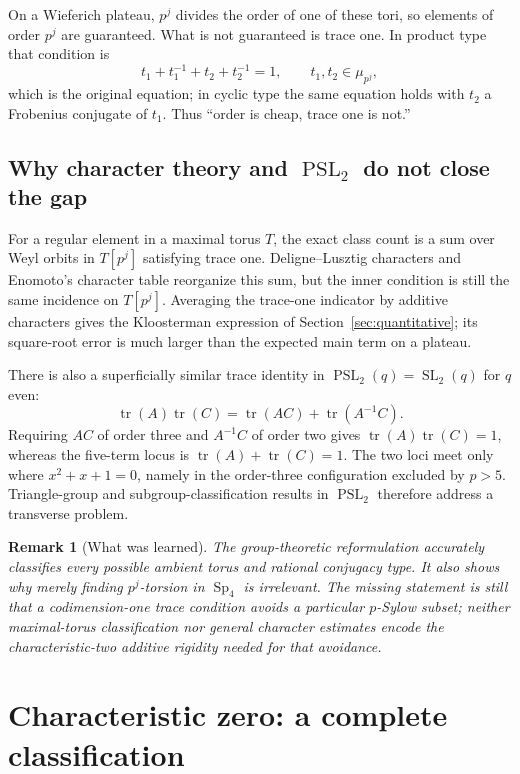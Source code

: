 \documentclass[a4paper]{article}
\newtheorem{remark}[theorem]{Remark}
\newcommand{\Sp}{\operatorname{Sp}}
\newcommand{\SL}{\operatorname{SL}}
\newcommand{\PSL}{\operatorname{PSL}}
\begin{document}
On a Wieferich plateau, $p^j$ divides the order of one of these tori, so
elements of order $p^j$ are guaranteed.  What is not guaranteed is trace
one.  In product type that condition is
\[
	t_1+t_1^{-1}+t_2+t_2^{-1}=1,
	\qquad t_1,t_2\in\mu_{p^j},
\]
which is the original equation; in cyclic type the same equation holds
with $t_2$ a Frobenius conjugate of $t_1$.  Thus ``order is cheap, trace one
is not.''

\subsection{Why character theory and $\PSL_2$ do not close the gap}

For a regular element in a maximal torus $T$, the exact class count is a
sum over Weyl orbits in $T[p^j]$ satisfying trace one.  Deligne--Lusztig
characters and Enomoto's character table reorganize this sum, but the inner
condition is still the same incidence on $T[p^j]$.  Averaging the trace-one
indicator by additive characters gives the Kloosterman expression of
Section~\ref{sec:quantitative}; its square-root error is much larger than
the expected main term on a plateau.

There is also a superficially similar trace identity in
$\PSL_2(q)=\SL_2(q)$ for $q$ even:
\[
	\operatorname{tr}(A)\operatorname{tr}(C)
	=\operatorname{tr}(AC)+\operatorname{tr}(A^{-1}C).
\]
Requiring $AC$ of order three and $A^{-1}C$ of order two gives
$\operatorname{tr}(A)\operatorname{tr}(C)=1$, whereas the five-term locus
is $\operatorname{tr}(A)+\operatorname{tr}(C)=1$.  The two loci meet only
where $x^2+x+1=0$, namely in the order-three configuration excluded by
$p>5$.  Triangle-group and subgroup-classification results in $\PSL_2$
therefore address a transverse problem.

\begin{remark}[What was learned]
	The group-theoretic reformulation accurately classifies every possible
	ambient torus and rational conjugacy type.  It also shows why merely
	finding $p^j$-torsion in $\Sp_4$ is irrelevant.  The missing statement
	is still that a codimension-one trace condition avoids a particular
	$p$-Sylow subset; neither maximal-torus classification nor general
	character estimates encode the characteristic-two additive rigidity
	needed for that avoidance.
\end{remark}

\section{Characteristic zero: a complete classification}\label{sec:charzero}
\end{document}
